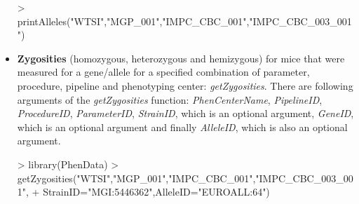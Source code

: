 \documentclass[a4paper]{article}
\begin{document}
\begin{itemize}
\begin{Schunk}
\begin{Sinput}
> printAlleles("WTSI","MGP_001","IMPC_CBC_001","IMPC_CBC_003_001")
\end{Sinput}
\end{Schunk}
\item \textbf{Zygosities} (homozygous, heterozygous and hemizygous) for mice that were measured for a gene/allele for a specified combination of parameter, procedure, pipeline and phenotyping center: \textit{getZygosities}. There are following arguments of the \textit{getZygosities} function:  \textit{PhenCenterName}, \textit{PipelineID}, \textit{ProcedureID}, \textit{ParameterID}, \textit{StrainID}, which is an optional argument, \textit{GeneID}, which is an optional argument and finally \textit{AlleleID}, which  is also an optional argument. 
\begin{Schunk}
\begin{Sinput}
> library(PhenData)
> getZygosities("WTSI","MGP_001","IMPC_CBC_001","IMPC_CBC_003_001",
+ StrainID="MGI:5446362",AlleleID="EUROALL:64")
\end{Sinput}
\end{Schunk}
\end{itemize}
\end{document}
